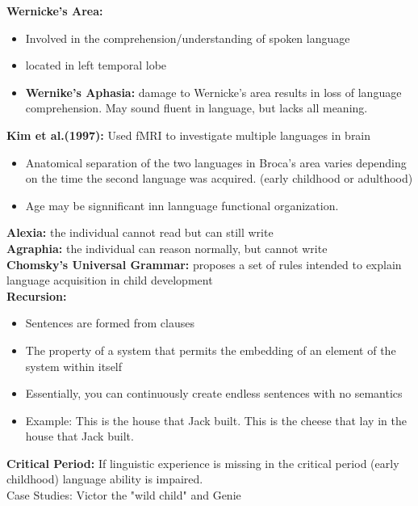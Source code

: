 \documentclass{article}
\begin{document}
\noindent \textbf{Wernicke's Area:}
\begin{itemize}
    \item Involved in the comprehension/understanding of spoken language
    \item located in left temporal lobe 
    \item \textbf{Wernike's Aphasia:} damage to Wernicke's area results in loss of language comprehension. May sound fluent in language, but lacks all meaning. 
\end{itemize}

\noindent \textbf{Kim et al.(1997):} Used fMRI to investigate multiple languages in brain 
\begin{itemize}
    \item Anatomical separation of the two languages in Broca's area varies depending on the time the second language was acquired. (early childhood or adulthood)
    \item Age may be signnificant inn lannguage functional organization. 
\end{itemize}

\noindent \textbf{Alexia:} the individual cannot read but can still write \\
\textbf{Agraphia:} the individual can reason normally, but cannot write \\
 
\noindent \textbf{Chomsky's Universal Grammar:} proposes a set of rules intended to explain language acquisition in child development \\

\noindent \textbf{Recursion:} 
\begin{itemize}
    \item Sentences are formed from clauses 
    \item The property of a system that permits the embedding of an element of the system within itself 
    \item Essentially, you can continuously create endless sentences with no semantics
    \item Example:
        \subitem This is the house that Jack built.
        \subitem This is the cheese that lay in the house that Jack built.
\end{itemize}

\noindent \textbf{Critical Period:} If linguistic experience is missing in the critical period (early childhood) language ability is impaired. \\
Case Studies: Victor the "wild child" and Genie \\
\end{document}
